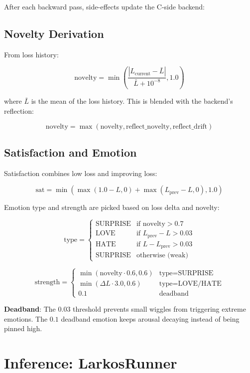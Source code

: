 \documentclass[12pt]{article}
\begin{document}
After each backward pass, side-effects update the C-side backend:

\subsection{Novelty Derivation}

From loss history:

\[
  \text{novelty} = \min\left(
    \frac{|L_{\text{current}} - \bar{L}|}{\bar{L} + 10^{-8}}, 1.0
  \right)
\]

where $\bar{L}$ is the mean of the loss history. This is blended with the
backend's reflection:

\[
  \text{novelty} = \max(\text{novelty}, \text{reflect\_novelty},
    \text{reflect\_drift})
\]

\subsection{Satisfaction and Emotion}

Satisfaction combines low loss and improving loss:

\[
  \text{sat} = \min(\max(1.0 - L, 0) + \max(L_{\text{prev}} - L, 0), 1.0)
\]

Emotion type and strength are picked based on loss delta and novelty:

\[
  \text{type} = \begin{cases}
    \text{SURPRISE} & \text{if } \text{novelty} > 0.7 \\
    \text{LOVE} & \text{if } L_{\text{prev}} - L > 0.03 \\
    \text{HATE} & \text{if } L - L_{\text{prev}} > 0.03 \\
    \text{SURPRISE} & \text{otherwise (weak)}
  \end{cases}
\]

\[
  \text{strength} = \begin{cases}
    \min(\text{novelty} \cdot 0.6, 0.6) & \text{type} = \text{SURPRISE} \\
    \min(\Delta L \cdot 3.0, 0.6) & \text{type} = \text{LOVE/HATE} \\
    0.1 & \text{deadband}
  \end{cases}
\]

\textbf{Deadband}: The $0.03$ threshold prevents small wiggles from
triggering extreme emotions. The $0.1$ deadband emotion keeps arousal
decaying instead of being pinned high.

\section{Inference: LarkosRunner}
\end{document}
